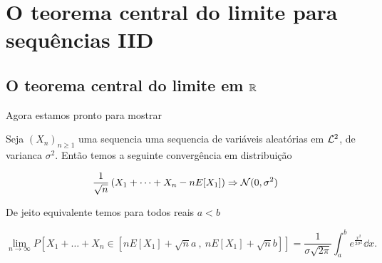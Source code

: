 \section{O teorema central do limite para sequências IID}


\subsection{O teorema central do limite em ${\mathbb R}$}

Agora estamos pronto para mostrar
\begin{theorem}
 Seja $(X_n)_{n\ge 1}$ uma sequencia uma sequencia de variáveis aleatórias em ${\mathcal L}^2$, de varianca $\sigma^2$.
 Então temos a seguinte convergência em distribuição

 \begin{equation}
  \frac{1}{\sqrt{n}}\left(X_1+\dots+X_n-n E[X_1]\right) \Rightarrow {\ensuremath{\mathcal N}}(0,\sigma^2)
 \end{equation}

 De jeito equivalente temos para todos reais $a<b$

 \begin{equation}
 \lim_{n\to \infty} P\left[  X_1+\dots+X_n\in [nE[X_1]+\sqrt{n}a \ ,\  nE[X_1]+\sqrt{n}b]\right]=\frac{1}{\sigma \sqrt{2\pi}} \int^b_a e^{\frac{x^2}{2\sigma^2}} \dd x.
 \end{equation}


\end{theorem}

